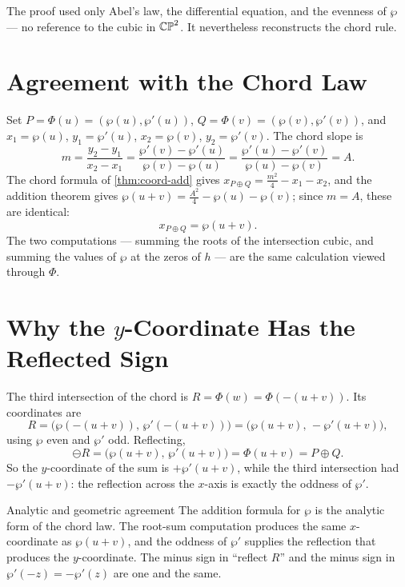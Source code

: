 The proof used only Abel's law, the differential equation, and the evenness of
\(\wp\) --- no reference to the cubic in \(\mathbb{CP}^2\). It nevertheless reconstructs the
chord rule.

\section{Agreement with the Chord Law}
\label{sec:aa-chord}

Set \(P = \Phi(u) = (\wp(u), \wp'(u))\), \(Q = \Phi(v) = (\wp(v), \wp'(v))\), and
\(x_1 = \wp(u)\), \(y_1 = \wp'(u)\), \(x_2 = \wp(v)\), \(y_2 = \wp'(v)\). The chord
slope is
\[
  m = \frac{y_2 - y_1}{x_2 - x_1}
    = \frac{\wp'(v) - \wp'(u)}{\wp(v) - \wp(u)}
    = \frac{\wp'(u) - \wp'(v)}{\wp(u) - \wp(v)} = A .
\]
The chord formula of \cref{thm:coord-add} gives \(x_{P\oplus Q} = \tfrac{m^2}{4} -
x_1 - x_2\), and the addition theorem gives \(\wp(u+v) = \tfrac{A^2}{4} - \wp(u) -
\wp(v)\); since \(m = A\), these are identical:
\[
  x_{P \oplus Q} = \wp(u+v).
\]
The two computations --- summing the roots of the intersection cubic, and summing
the values of \(\wp\) at the zeros of \(h\) --- are the same calculation viewed
through \(\Phi\).

\section{Why the \texorpdfstring{$y$}{y}-Coordinate Has the Reflected Sign}
\label{sec:aa-reflection}

The third intersection of the chord is \(R = \Phi(w) = \Phi(-(u+v))\). Its
coordinates are
\[
  R = \bigl( \wp(-(u+v)),\, \wp'(-(u+v)) \bigr)
    = \bigl( \wp(u+v),\, -\wp'(u+v) \bigr),
\]
using \(\wp\) even and \(\wp'\) odd. Reflecting,
\[
  \ominus R = \bigl( \wp(u+v),\, \wp'(u+v) \bigr) = \Phi(u+v) = P \oplus Q .
\]
So the \(y\)-coordinate of the sum is \(+\wp'(u+v)\), while the third intersection
had \(-\wp'(u+v)\): the reflection across the \(x\)-axis is exactly the oddness of
\(\wp'\).

\begin{keyidea}{Analytic and geometric agreement}
The addition formula for \(\wp\) is the analytic form of the chord law. The
root-sum computation produces the same \(x\)-coordinate as \(\wp(u+v)\), and the
oddness of \(\wp'\) supplies the reflection that produces the \(y\)-coordinate.
The minus sign in ``reflect \(R\)'' and the minus sign in \(\wp'(-z) = -\wp'(z)\)
are one and the same.
\end{keyidea}

